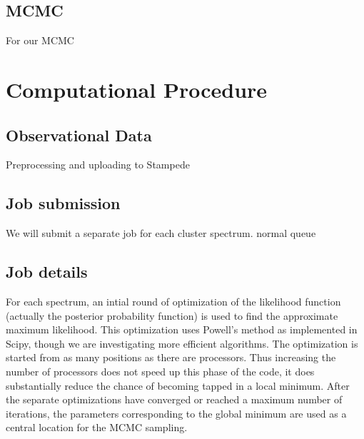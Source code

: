 \subsection{MCMC}
For our MCMC


\section{Computational Procedure}

\subsection{Observational Data}
Preprocessing and uploading to Stampede

\subsection{Job submission}
We will submit a separate job for each cluster spectrum. normal queue

\subsection{Job details}
For each spectrum, an intial round of optimization of the likelihood
function (actually the posterior probability function) is used to find
the approximate maximum likelihood. This optimization uses Powell's
method as implemented in Scipy, though we are investigating more
efficient algorithms. The optimization is started from as many
positions as there are processors. Thus increasing the number of
processors does not speed up this phase of the code, it does
substantially reduce the chance of becoming tapped in a local minimum.
After the separate optimizations have converged or reached a maximum
number of iterations, the parameters corresponding to the global
minimum are used as a central location for the MCMC sampling.

